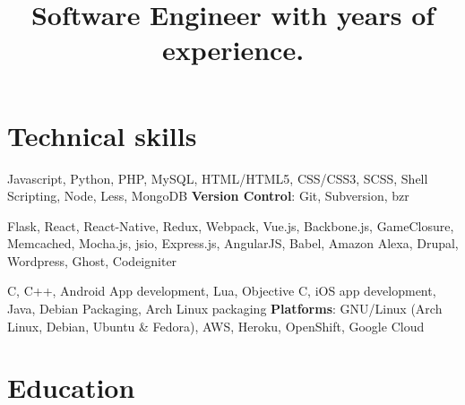 \documentclass[11pt,a4paper]{moderncv}
\title{Software Engineer with \YExperience \Plus { } years of experience.}
\begin{document}
\maketitle

\section{Technical skills}
           {Javascript, Python, PHP, MySQL, HTML/HTML5, CSS/CSS3, SCSS, Shell Scripting, Node, Less, MongoDB}
           {\textbf{Version Control}: }
           {Git, Subversion, bzr}

           {Flask, React, React-Native, Redux, Webpack, Vue.js, Backbone.js, GameClosure, Memcached, Mocha.js, jsio, Express.js, AngularJS, Babel, Amazon Alexa, Drupal, Wordpress, Ghost, Codeigniter}

           {C, C++, Android App development, Lua, Objective C, iOS app development, Java, Debian Packaging, Arch Linux packaging}
           {\textbf{Platforms}: }
           {GNU/Linux (Arch Linux, Debian, Ubuntu \& Fedora), AWS, Heroku, OpenShift, Google Cloud}

\section{Education}

\pagebreak
\end{document}
